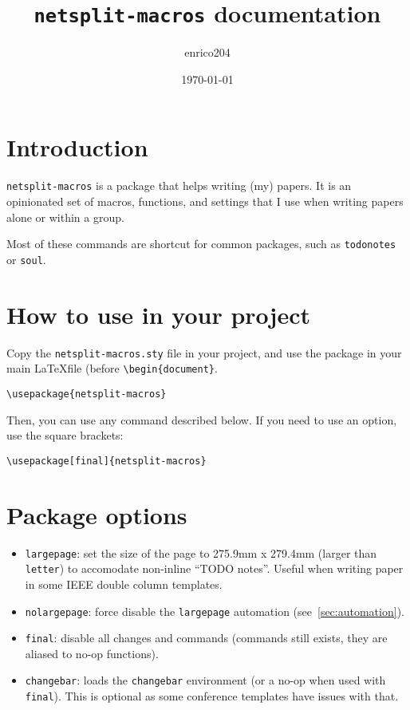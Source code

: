 \documentclass[a4paper]{article}
\title{\texttt{netsplit-macros} documentation}
\author{enrico204}
\date{\today}
\begin{document}
\maketitle

\tableofcontents

\section{Introduction}
\texttt{netsplit-macros} is a package that helps writing (my) papers. It is an opinionated set of macros, functions, and settings that I use when writing papers alone or within a group.

Most of these commands are shortcut for common packages, such as \texttt{todonotes} or \texttt{soul}.

\section{How to use in your project}

Copy the \texttt{netsplit-macros.sty} file in your project, and use the package in your main \LaTeX file (before \texttt{\textbackslash begin\{document\}}.

\begin{verbatim}
\usepackage{netsplit-macros}
\end{verbatim}

Then, you can use any command described below. If you need to use an option, use the square brackets:

\begin{verbatim}
\usepackage[final]{netsplit-macros}
\end{verbatim}


\section{Package options}
\label{sec:options}

\begin{itemize}
    \item \texttt{largepage}: set the size of the page to 275.9mm x 279.4mm (larger than \texttt{letter}) to accomodate non-inline ``TODO notes''. Useful when writing paper in some IEEE double column templates.
    \item \texttt{nolargepage}: force disable the \texttt{largepage} automation (see~\autoref{sec:automation}).
    \item \texttt{final}: disable all changes and commands (commands still exists, they are aliased to no-op functions).
    \item \texttt{changebar}: loads the \texttt{changebar} environment (or a no-op when used with \texttt{final}). This is optional as some conference templates have issues with that.
\end{itemize}
\end{document}

